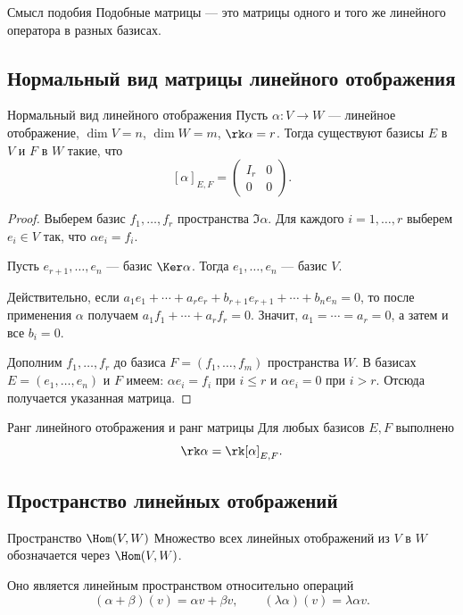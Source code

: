 \begin{Remark}{Смысл подобия}{}
	Подобные матрицы --- это матрицы одного и того же линейного оператора в разных базисах.
\end{Remark}

\subsection{Нормальный вид матрицы линейного отображения}

\begin{Theorem}{Нормальный вид линейного отображения}{}
	Пусть $\alpha\colon V\to W$ --- линейное отображение,
	$\dim V=n$, $\dim W=m$, $\rk\alpha=r$.
	Тогда существуют базисы $E$ в $V$ и $F$ в $W$ такие, что
	\[
	[\alpha]_{E,F}
	=
	\begin{pmatrix}
		I_r & 0\\
		0 & 0
	\end{pmatrix}.
	\]
\end{Theorem}

\begin{proof}
	Выберем базис $f_1,\ldots,f_r$ пространства $\Im\alpha$.
	Для каждого $i=1,\ldots,r$ выберем $e_i\in V$ так, что $\alpha e_i=f_i$.
	
	Пусть $e_{r+1},\ldots,e_n$ --- базис $\Ker\alpha$.
	Тогда $e_1,\ldots,e_n$ --- базис $V$.
	
	Действительно, если
	$a_1e_1+\cdots+a_re_r+b_{r+1}e_{r+1}+\cdots+b_ne_n=0$,
	то после применения $\alpha$ получаем
	$a_1f_1+\cdots+a_rf_r=0$.
	Значит, $a_1=\cdots=a_r=0$, а затем и все $b_i=0$.
	
	Дополним $f_1,\ldots,f_r$ до базиса $F=(f_1,\ldots,f_m)$ пространства $W$.
	В базисах $E=(e_1,\ldots,e_n)$ и $F$ имеем:
	$\alpha e_i=f_i$ при $i\le r$ и $\alpha e_i=0$ при $i>r$.
	Отсюда получается указанная матрица.
\end{proof}

\begin{Corollary}{Ранг линейного отображения и ранг матрицы}{}
	Для любых базисов $E,F$ выполнено
	\[
	\rk \alpha=\rk [\alpha]_{E,F}.
	\]
\end{Corollary}

\subsection{Пространство линейных отображений}

\begin{Definition}{Пространство $\Hom(V,W)$}{}
	Множество всех линейных отображений из $V$ в $W$ обозначается через $\Hom(V,W)$.
	
	Оно является линейным пространством относительно операций
	\[
	(\alpha+\beta)(v)=\alpha v+\beta v,
	\qquad
	(\lambda\alpha)(v)=\lambda\alpha v.
	\]
\end{Definition}

